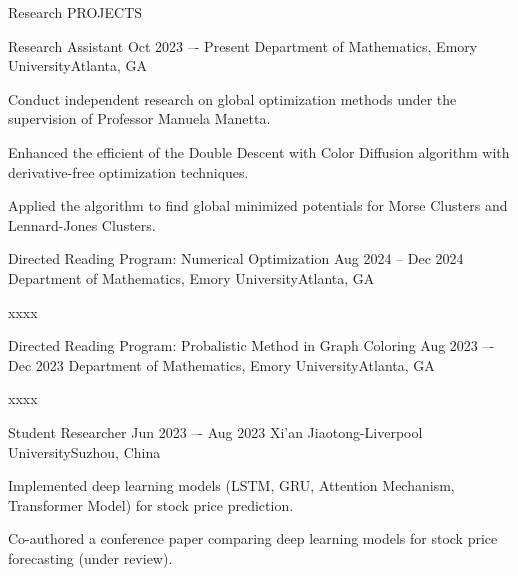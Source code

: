 \documentclass[10pt, letterpaper]{resume} %
\begin{document}

\begin{rSection}{Research PROJECTS}

\begin{rSubsection}
	{Research Assistant}
	{Oct 2023 –- Present}
	{Department of Mathematics, Emory University\hfill{Atlanta, GA}}
	
	\item Conduct independent research on global optimization methods under the supervision of Professor Manuela Manetta.
	\item Enhanced the efficient of the Double Descent with Color Diffusion algorithm with derivative-free optimization techniques.
	\item Applied the algorithm to find global minimized potentials for Morse Clusters and Lennard-Jones Clusters.
\end{rSubsection}

\begin{rSubsection}
	{Directed Reading Program: Numerical Optimization}
	{Aug 2024 -- Dec 2024}
	{Department of Mathematics, Emory University\hfill{Atlanta, GA}}
	
	\item xxxx
\end{rSubsection}

\begin{rSubsection}
	{Directed Reading Program: Probalistic Method in Graph Coloring}
	{Aug 2023 –- Dec 2023}
	{Department of Mathematics, Emory University\hfill{Atlanta, GA}}
	
	\item xxxx
\end{rSubsection}

\begin{rSubsection}
	{Student Researcher}
	{Jun 2023 –- Aug 2023}
	{Xi’an Jiaotong-Liverpool University\hfill{Suzhou, China}}
	
	\item Implemented deep learning models (LSTM, GRU, Attention Mechanism, Transformer Model) for stock price prediction.
	\item Co-authored a conference paper comparing deep learning models for stock price forecasting (under review).
\end{rSubsection}

\end{rSection} 

% 
\end{document}
